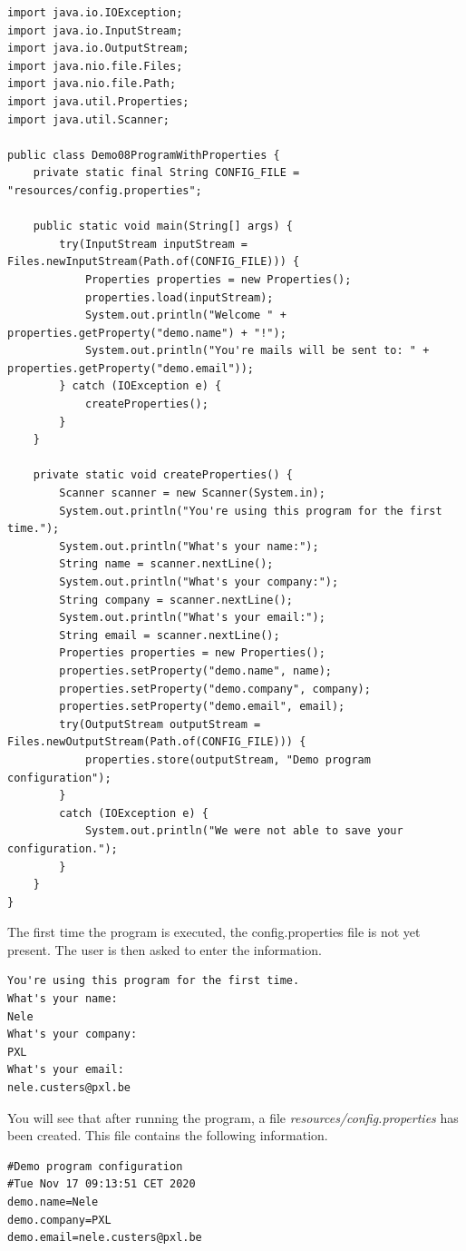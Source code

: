 \begin{lstlisting}
import java.io.IOException;
import java.io.InputStream;
import java.io.OutputStream;
import java.nio.file.Files;
import java.nio.file.Path;
import java.util.Properties;
import java.util.Scanner;

public class Demo08ProgramWithProperties {
	private static final String CONFIG_FILE = "resources/config.properties";

	public static void main(String[] args) {
		try(InputStream inputStream = Files.newInputStream(Path.of(CONFIG_FILE))) {
			Properties properties = new Properties();
			properties.load(inputStream);
			System.out.println("Welcome " + properties.getProperty("demo.name") + "!");
			System.out.println("You're mails will be sent to: " + properties.getProperty("demo.email"));
		} catch (IOException e) {
			createProperties();
		}
	}

	private static void createProperties() {
		Scanner scanner = new Scanner(System.in);
		System.out.println("You're using this program for the first time.");
		System.out.println("What's your name:");
		String name = scanner.nextLine();
		System.out.println("What's your company:");
		String company = scanner.nextLine();
		System.out.println("What's your email:");
		String email = scanner.nextLine();
		Properties properties = new Properties();
		properties.setProperty("demo.name", name);
		properties.setProperty("demo.company", company);
		properties.setProperty("demo.email", email);
		try(OutputStream outputStream = Files.newOutputStream(Path.of(CONFIG_FILE))) {
			properties.store(outputStream, "Demo program configuration");
		}
		catch (IOException e) {
			System.out.println("We were not able to save your configuration.");
		}
	}
}
\end{lstlisting}

The first time the program is executed, the config.properties file is not yet present. The user is then asked to enter the information.

\begin{verbatim}
You're using this program for the first time.
What's your name:
Nele
What's your company:
PXL
What's your email:
nele.custers@pxl.be
\end{verbatim}

You will see that after running the program, a file \textit{resources/config.properties} has been created. This file contains the following information.

\begin{verbatim}
#Demo program configuration
#Tue Nov 17 09:13:51 CET 2020
demo.name=Nele
demo.company=PXL
demo.email=nele.custers@pxl.be
\end{verbatim}

